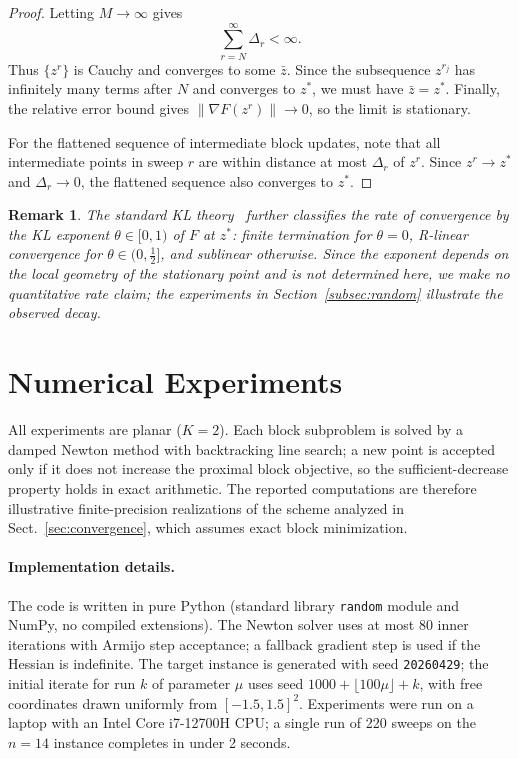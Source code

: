 \documentclass[11pt]{article}
\newtheorem{remark}{Remark}
\begin{document}
\begin{proof}
Letting \(M\to\infty\) gives
\[
    \sum_{r=N}^{\infty}\Delta_r<\infty.
\]
Thus \(\{z^r\}\) is Cauchy and converges to some \(\bar z\).  Since the subsequence \(z^{r_j}\) has infinitely many terms after \(N\) and converges to \(z^*\), we must have \(\bar z=z^*\).  Finally, the relative error bound gives \(\|\nabla F(z^r)\|\to0\), so the limit is stationary.

For the flattened sequence of intermediate block updates, note that all intermediate points in sweep \(r\) are within distance at most \(\Delta_r\) of \(z^r\).  Since \(z^r\to z^*\) and \(\Delta_r\to0\), the flattened sequence also converges to \(z^*\).
\end{proof}

\begin{remark}
The standard KL theory~\cite{attouch2013convergence} further classifies the rate of convergence by the KL exponent $\theta\in[0,1)$ of $F$ at $z^*$: finite termination for $\theta=0$, R-linear convergence for $\theta\in(0,\frac12]$, and sublinear otherwise.  Since the exponent depends on the local geometry of the stationary point and is not determined here, we make no quantitative rate claim; the experiments in Section~\ref{subsec:random} illustrate the observed decay.
\end{remark}

\section{Numerical Experiments}
\label{sec:experiments}

All experiments are planar (\(K=2\)).  Each block subproblem is solved by a damped Newton method with backtracking line search; a new point is accepted only if it does not increase the proximal block objective, so the sufficient-decrease property holds in exact arithmetic.  The reported computations are therefore illustrative finite-precision realizations of the scheme analyzed in Sect.~\ref{sec:convergence}, which assumes exact block minimization.

\paragraph{Implementation details.}
The code is written in pure Python (standard library \texttt{random} module and NumPy, no compiled extensions).  The Newton solver uses at most 80 inner iterations with Armijo step acceptance; a fallback gradient step is used if the Hessian is indefinite.  The target instance is generated with seed \texttt{20260429}; the initial iterate for run $k$ of parameter $\mu$ uses seed $1000+\lfloor100\mu\rfloor+k$, with free coordinates drawn uniformly from $[-1.5,1.5]^2$.  Experiments were run on a laptop with an Intel Core i7-12700H CPU; a single run of 220 sweeps on the $n=14$ instance completes in under 2 seconds.
\end{document}
